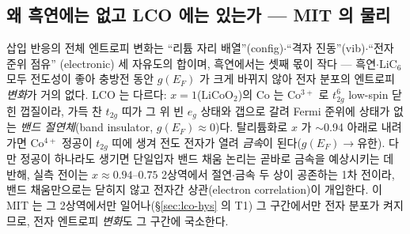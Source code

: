 \subsection{왜 흑연에는 없고 LCO 에는 있는가 --- MIT 의 물리}\label{sec:lco-why}
삽입 반응의 전체 엔트로피 변화는 ``리튬 자리 배열''(config)$\cdot$``격자 진동''(vib)$\cdot$``전자 준위 점유''
(electronic) 세 자유도의 합이며, 흑연에서는 셋째 몫이 작다 --- 흑연$\cdot$$\mathrm{LiC_6}$ 모두 전도성이 좋아
충방전 동안 $g(E_F)$ 가 크게 바뀌지 않아 전자 분포의 엔트로피 \emph{변화}가 거의 없다. LCO 는 다르다:
$x{=}1$($\mathrm{LiCoO_2}$)의 Co 는 Co$^{3+}$ 로 $t_{2g}^6$ low-spin 닫힌 껍질이라, 가득 찬 $t_{2g}$ 띠가 그 위 빈
$e_g$ 상태와 갭으로 갈려 Fermi 준위에 상태가 없는 \emph{밴드 절연체}(band insulator, $g(E_F)\!\approx\!0$)다.
탈리튬화로 $x$ 가 $\sim$0.94 아래로 내려가면 Co$^{4+}$ 정공이 $t_{2g}$ 띠에 생겨 전도 전자가 열려 \emph{금속}이
된다($g(E_F)\!\to\!$유한)\cite{menetrier1999,motohashi2009}. 다만 정공이 하나라도 생기면 단일입자 밴드 채움
논리는 곧바로 금속을 예상시키는 데 반해, 실측 전이는 $x\approx0.94$--$0.75$ 2상역에서 절연$\cdot$금속 두 상이
공존하는 1차 전이라, 밴드 채움만으로는 닫히지 않고 전자간 상관(electron correlation)이 개입한다\cite{reimers1992}.
이 MIT 는 그 2상역에서만 일어나(\S\ref{sec:lco-hys} 의 T1) 그 구간에서만 전자 분포가 켜지므로, 전자 엔트로피
\emph{변화}도 그 구간에 국소한다.

